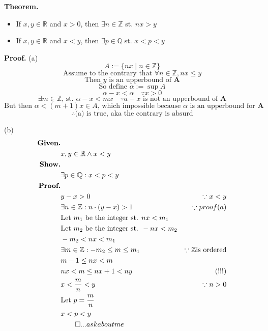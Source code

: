 \documentclass{article}
\newcommand{\set}[2]{
	\{ #1 \mid #2 \}
}
\begin{document}
{\noindent\bf Theorem.}
	\begin{itemize}
		\item If $x, y \in \mathbb{R}$ and $x > 0$, then $\exists n \in \mathbb{Z}$ st. $nx > y$
		\item If $x, y \in \mathbb{R}$ and $x < y$, then $\exists p \in \mathbb{Q}$ st. $x < p < y$
	\end{itemize}

{\noindent\bf Proof.}
	(a)
	$$ A := \set{nx}{n \in \mathbb{Z}} $$
	$$ \text{Assume to the contrary that } \forall n \in \mathbb{Z}, nx \le y $$
	$$ \text{Then } y \text{ is an upperbound of } \mathbf{A} $$
	$$ \text{So define } \alpha := \sup A $$
	$$ \alpha - x < \alpha \quad\because x > 0 $$
	$$ \exists m \in \mathbb{Z} \text{, st. } \alpha - x < mx \quad\because a - x \text{ is not an upperbound of } \mathbf{A} $$
	$$ \text{But then } \alpha < (m+1)x \in A \text{, which impossible because $\alpha$ is an upperbound for $\mathbf{A}$}$$
	$$ \therefore \text{(a) is true, aka the contrary is absurd} $$
	
	(b)
	\begin{align*}
		\text{\bf Given.}	\\
			& x, y \in \mathbb{R} \land x < y			\\
		\text{\bf Show.}	\\
			& \exists p \in \mathbb{Q}: x < p < y \\
		\text{\bf Proof.}	\\
			& y - x > 0															& \because x < y				\\
			& \exists n \in \mathbb{Z}: n \cdot (y-x) > 1 & \because proof (a)		\\
			& \text{Let $m_1$ be the integer st. } nx < m_1									\\
			& \text{Let $m_2$ be the integer st. } -nx < m_2								\\
			& -m_2 < nx < m_1 \\
			& \exists m \in \mathbb{Z}: -m_2 \le m \le m_1 & \because \mathbb{Z}\text{is ordered} \\
			& m - 1 \le nx < m \\			
			& nx < m \le nx + 1 < ny & (!!!) \\
			& x < \frac{m}{n} < y & \because n > 0 \\
			& \text{Let } p = \frac{m}{n} \\
			& x < p < y \\
			& \qed... ask about me
	\end{align*}
\end{document}
